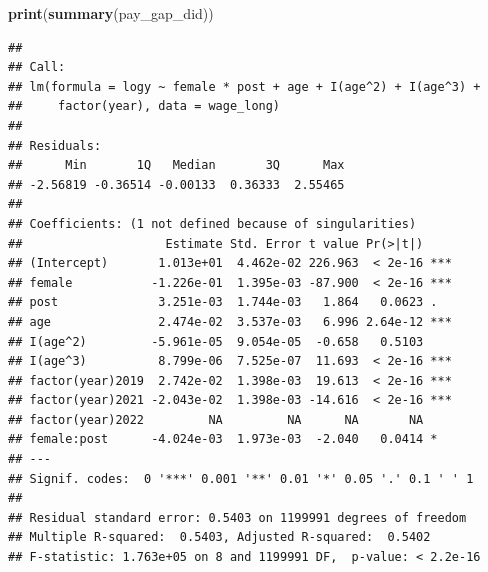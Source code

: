 \documentclass[
]{article}
\newenvironment{Shaded}{\begin{snugshade}}{\end{snugshade}}
\newcommand{\FunctionTok}[1]{\textcolor[rgb]{0.13,0.29,0.53}{\textbf{#1}}}
\newcommand{\NormalTok}[1]{#1}
\begin{document}
\begin{Shaded}
\begin{Highlighting}[]
\FunctionTok{print}\NormalTok{(}\FunctionTok{summary}\NormalTok{(pay\_gap\_did))}
\end{Highlighting}
\end{Shaded}

\begin{verbatim}
## 
## Call:
## lm(formula = logy ~ female * post + age + I(age^2) + I(age^3) + 
##     factor(year), data = wage_long)
## 
## Residuals:
##      Min       1Q   Median       3Q      Max 
## -2.56819 -0.36514 -0.00133  0.36333  2.55465 
## 
## Coefficients: (1 not defined because of singularities)
##                    Estimate Std. Error t value Pr(>|t|)    
## (Intercept)       1.013e+01  4.462e-02 226.963  < 2e-16 ***
## female           -1.226e-01  1.395e-03 -87.900  < 2e-16 ***
## post              3.251e-03  1.744e-03   1.864   0.0623 .  
## age               2.474e-02  3.537e-03   6.996 2.64e-12 ***
## I(age^2)         -5.961e-05  9.054e-05  -0.658   0.5103    
## I(age^3)          8.799e-06  7.525e-07  11.693  < 2e-16 ***
## factor(year)2019  2.742e-02  1.398e-03  19.613  < 2e-16 ***
## factor(year)2021 -2.043e-02  1.398e-03 -14.616  < 2e-16 ***
## factor(year)2022         NA         NA      NA       NA    
## female:post      -4.024e-03  1.973e-03  -2.040   0.0414 *  
## ---
## Signif. codes:  0 '***' 0.001 '**' 0.01 '*' 0.05 '.' 0.1 ' ' 1
## 
## Residual standard error: 0.5403 on 1199991 degrees of freedom
## Multiple R-squared:  0.5403, Adjusted R-squared:  0.5402 
## F-statistic: 1.763e+05 on 8 and 1199991 DF,  p-value: < 2.2e-16
\end{verbatim}
\end{document}
